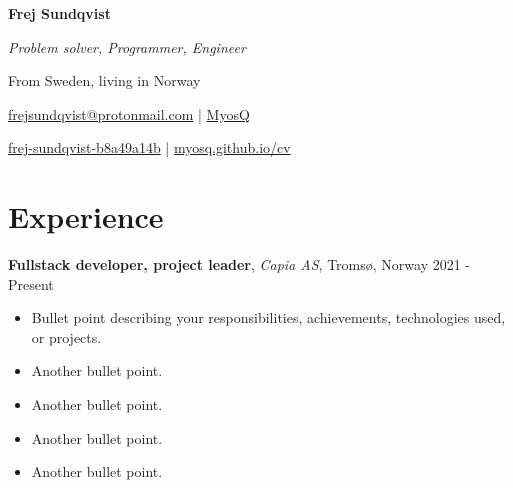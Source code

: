 \documentclass[11pt, a4paper]{article}
\begin{document}
\noindent
\begin{minipage}{0.25\textwidth}

\end{minipage}%
\begin{minipage}{0.75\textwidth}
    \centerline{
        \Large\bfseries Frej Sundqvist
    }
    \vspace{0.2em}
    \centerline{
        \textit{Problem solver, Programmer, Engineer}
    }
    \centerline{
        From Sweden, living in Norway
    }
    \vspace{0.5em}
    \centerline{
        {\faEnvelopeO} \href{mailto:frejsundqvist@protonmail.com}{frejsundqvist@protonmail.com}
        |
        {\faGithub} \href{https://github.com/MyosQ}{MyosQ}
    }
    \centerline{
        {\faLinkedin} \href{https://linkedin.com/in/frej-sundqvist-b8a49a14b}{frej-sundqvist-b8a49a14b}
        |
        {\faGlobe} \href{https://myosq.github.io/cv}{myosq.github.io/cv}    
    }
\end{minipage}

\vspace{1em}

\section*{Experience}
\textbf{Fullstack developer, project leader}, \textit{Capia AS}, Tromsø, Norway \hfill 2021 - Present
\begin{itemize}[noitemsep]
    \item Bullet point describing your responsibilities, achievements, technologies used, or projects.
    \item Another bullet point.
    \item Another bullet point.
    \item Another bullet point.
    \item Another bullet point.
\end{itemize}
\end{document}
